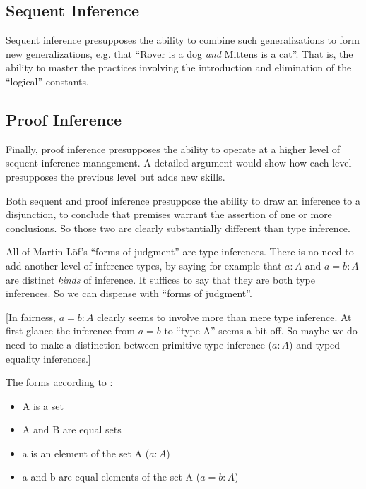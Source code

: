 \documentclass{article}
\begin{document}

\subsection{Sequent Inference}
Sequent inference presupposes the ability to combine such
generalizations to form new generalizations, e.g. that ``Rover is a
dog \textit{and} Mittens is a cat''. That is, the ability to master
the practices involving the introduction and elimination of the
``logical'' constants.

\subsection{Proof Inference}
Finally, proof inference presupposes the ability to operate at a higher
level of sequent inference management. A detailed argument would show
how each level presupposes the previous level but adds new skills.

Both sequent and proof inference presuppose the ability to draw an
inference to a disjunction, to conclude that premises warrant the
assertion of one or more conclusions. So those two are clearly
substantially different than type inference.


All of Martin-Löf's ``forms of judgment'' are type inferences. There
is no need to add another level of inference types, by saying for
example that \mbox{\(a:A\)} and \mbox{\(a=b:A\)} are distinct
\textit{kinds} of inference. It suffices to say that they are both
type inferences. So we can dispense with ``forms of judgment''.

[In fairness, \(a=b:A\) clearly seems to involve more than mere type
  inference. At first glance the inference from \(a=b\) to ``type A''
  seems a bit off. So maybe we do need to make a distinction between
  primitive type inference (\(a:A\)) and typed equality inferences.]


The forms according to  \parencite{martin1984intuitionistic}:

\begin{itemize}
\item A is a set
\item A and B are equal sets
\item a is an element of the set A  (\(a:A\))
\item a and b are equal elements of the set A (\(a=b:A\))
\end{itemize}
\end{document}
